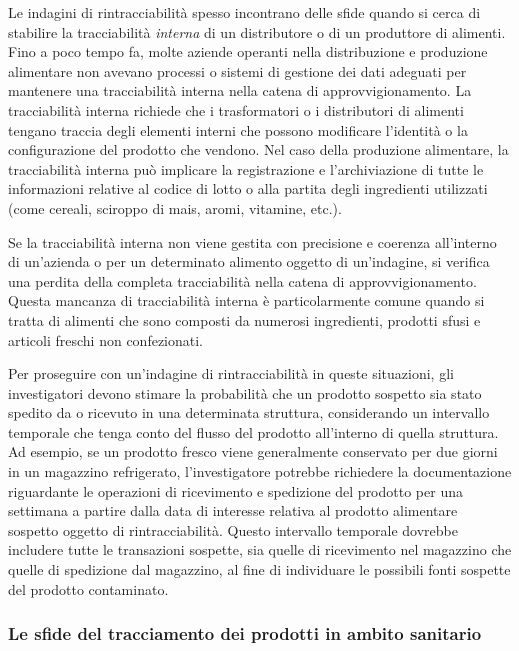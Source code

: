 Le indagini di rintracciabilità spesso incontrano delle sfide quando si cerca di stabilire la tracciabilità \textit{interna} di un distributore o di un produttore di alimenti. Fino a poco tempo fa, molte aziende operanti nella distribuzione e produzione alimentare non avevano processi o sistemi di gestione dei dati adeguati per mantenere una tracciabilità interna nella catena di approvvigionamento. La tracciabilità interna richiede che i trasformatori o i distributori di alimenti tengano traccia degli elementi interni che possono modificare l'identità o la configurazione del prodotto che vendono. Nel caso della produzione alimentare, la tracciabilità interna può implicare la registrazione e l'archiviazione di tutte le informazioni relative al codice di lotto o alla partita degli ingredienti utilizzati (come cereali, sciroppo di mais, aromi, vitamine, etc.).

Se la tracciabilità interna non viene gestita con precisione e coerenza all'interno di un'azienda o per un determinato alimento oggetto di un'indagine, si verifica una perdita della completa tracciabilità nella catena di approvvigionamento. Questa mancanza di tracciabilità interna è particolarmente comune quando si tratta di alimenti che sono composti da numerosi ingredienti, prodotti sfusi e articoli freschi non confezionati.

Per proseguire con un'indagine di rintracciabilità in queste situazioni, gli investigatori devono stimare la probabilità che un prodotto sospetto sia stato spedito da o ricevuto in una determinata struttura, considerando un intervallo temporale che tenga conto del flusso del prodotto all'interno di quella struttura. Ad esempio, se un prodotto fresco viene generalmente conservato per due giorni in un magazzino refrigerato, l'investigatore potrebbe richiedere la documentazione riguardante le operazioni di ricevimento e spedizione del prodotto per una settimana a partire dalla data di interesse relativa al prodotto alimentare sospetto oggetto di rintracciabilità. Questo intervallo temporale dovrebbe includere tutte le transazioni sospette, sia quelle di ricevimento nel magazzino che quelle di spedizione dal magazzino, al fine di individuare le possibili fonti sospette del prodotto contaminato.

\subsubsection{Le sfide del tracciamento dei prodotti in ambito sanitario}

